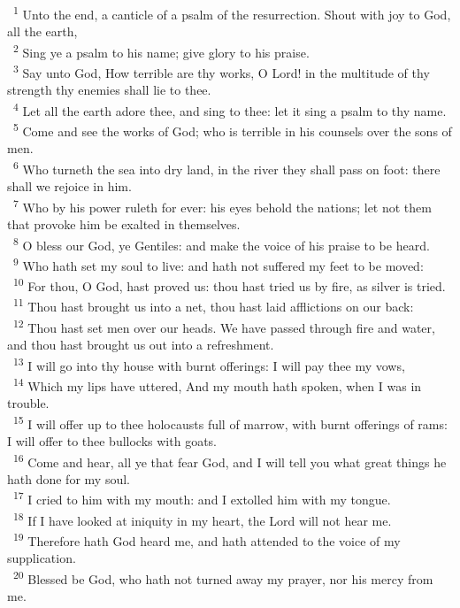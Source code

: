 \documentclass[a5paper,12pt]{article}
\begin{document}
\begin{multicols*}{2}
~\textsuperscript{1} Unto the end, a canticle of a psalm of the resurrection. Shout with joy to God, all the earth,\\
~\textsuperscript{2} Sing ye a psalm to his name; give glory to his praise.\\
~\textsuperscript{3} Say unto God, How terrible are thy works, O Lord! in the multitude of thy strength thy enemies shall lie to thee.\\
~\textsuperscript{4} Let all the earth adore thee, and sing to thee: let it sing a psalm to thy name.\\
~\textsuperscript{5} Come and see the works of God; who is terrible in his counsels over the sons of men.\\
~\textsuperscript{6} Who turneth the sea into dry land, in the river they shall pass on foot: there shall we rejoice in him.\\
~\textsuperscript{7} Who by his power ruleth for ever: his eyes behold the nations; let not them that provoke him be exalted in themselves.\\
~\textsuperscript{8} O bless our God, ye Gentiles: and make the voice of his praise to be heard.\\
~\textsuperscript{9} Who hath set my soul to live: and hath not suffered my feet to be moved:\\
~\textsuperscript{10} For thou, O God, hast proved us: thou hast tried us by fire, as silver is tried.\\
~\textsuperscript{11} Thou hast brought us into a net, thou hast laid afflictions on our back:\\
~\textsuperscript{12} Thou hast set men over our heads. We have passed through fire and water, and thou hast brought us out into a refreshment.\\
~\textsuperscript{13} I will go into thy house with burnt offerings: I will pay thee my vows,\\
~\textsuperscript{14} Which my lips have uttered, And my mouth hath spoken, when I was in trouble.\\
~\textsuperscript{15} I will offer up to thee holocausts full of marrow, with burnt offerings of rams: I will offer to thee bullocks with goats.\\
~\textsuperscript{16} Come and hear, all ye that fear God, and I will tell you what great things he hath done for my soul.\\
~\textsuperscript{17} I cried to him with my mouth: and I extolled him with my tongue.\\
~\textsuperscript{18} If I have looked at iniquity in my heart, the Lord will not hear me.\\
~\textsuperscript{19} Therefore hath God heard me, and hath attended to the voice of my supplication.\\
~\textsuperscript{20} Blessed be God, who hath not turned away my prayer, nor his mercy from me.\\


\end{multicols*}
\end{document}
